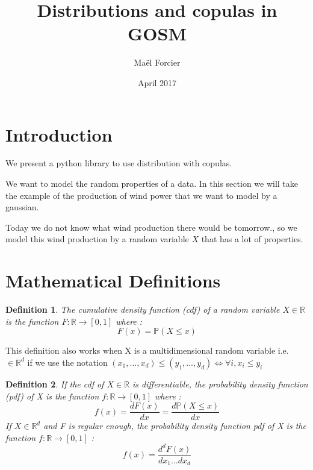 \documentclass{article}
\title{Distributions and copulas in GOSM}
\author{Ma\"{e}l Forcier}
\date{April 2017}
\begin{document}
   \maketitle
   \section{Introduction}

	We present a python library to use distribution with copulas.


	We want to model the random properties of a data. In this section we will take the example of the production of wind power that we want to model by a gaussian.

	Today we do not know what wind production there would be tomorrow., so we model this wind production by a random variable $X$ that has a lot of properties.

	\section{Mathematical Definitions}
	\newtheorem{definition}{Definition}
	\newtheorem{property}{Property}
	\begin{definition}
	The cumulative density function (cdf) of a random variable $X \in \mathbb{R}$ is the function $F : \mathbb{R} \to [0,1]$ where :
	\begin{equation*}
	F(x) = \mathbb{P}(X\leq x)
	\end{equation*}
	\end{definition}

	This definition also works when X is a multidimensional random	variable i.e. $\in \mathbb{R}^d$ if we use the notation $(x_1,...,x_d) \leq (y_1,...,y_d) \Leftrightarrow \forall i, x_i \leq y_i$


	\begin{definition}
	If the cdf of $X \in \mathbb{R}$ is differentiable, the probability density function (pdf) of X is the function $f : \mathbb{R} \to [0,1]$ where :
	\begin{equation*}
	f(x) = \frac{dF(x)}{dx} = \frac{d\mathbb{P}(X\leq x)}{dx}
	\end{equation*}
	If $X \in \mathbb{R}^d$ and F is regular enough, the probability density function pdf of X is the function $f : \mathbb{R} \to [0,1]$ :
	\begin{equation*}
	f(x) = \frac{d^d F(x)}{dx_1...dx_d}
	\end{equation*}
	\end{definition}
\end{document}
